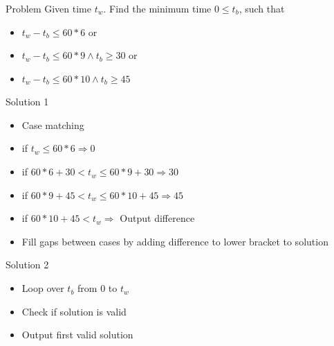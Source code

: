 \begin{frame}
  \frametitle{\problemtitle}
  \begin{block}{Problem}
    Given time $t_w$. Find the minimum time $0 \leq t_b$, such that
    \begin{itemize}
    \item $t_w - t_b \leq 60 * 6$ or
    \item $t_w - t_b \leq 60 * 9 \wedge t_b \geq 30$ or
    \item $t_w - t_b \leq 60 * 10 \wedge t_b \geq 45$
    \end{itemize}
    \pause{}
  \end{block}
   {
    \begin{block}{Solution 1}
      \begin{itemize}
      \item Case matching
      \item if $t_w \leq 60 * 6 \Rightarrow 0$
      \item if $60 * 6 + 30 < t_w \leq 60 * 9 + 30 \Rightarrow 30$
      \item if $60 * 9 + 45 < t_w \leq 60 * 10 + 45 \Rightarrow 45$
      \item if $60 * 10 + 45 < t_w \Rightarrow $ Output difference \pause{}
      \item Fill gaps between cases by adding difference to lower bracket to solution
      \end{itemize}
    \end{block}
  }
   {
    \begin{block}{Solution 2}
      \begin{itemize}
      \item Loop over $t_b$ from $0$ to $t_w$
      \item Check if solution is valid
      \item Output first valid solution
      \end{itemize}
    \end{block}
  }
\end{frame}

